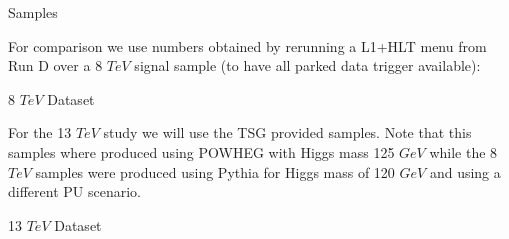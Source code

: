 \documentclass[8pt]{beamer}
\begin{document}
\begin{frame}{Samples}

For comparison we use numbers obtained by rerunning a L1+HLT menu from Run D over a 8 $TeV$ signal sample (to have all parked data trigger available):

\begin{block}{8 $TeV$ Dataset}


\end{block}

For the 13 $TeV$ study we will use the TSG provided samples. Note that this samples where produced using POWHEG with 
Higgs mass 125 $GeV$ while the 8 $TeV$ samples were produced using Pythia for Higgs mass of 120 $GeV$ and using a 
different PU scenario.

\begin{block}{13 $TeV$ Dataset}


\end{block}
 
\end{frame}
\end{document}
